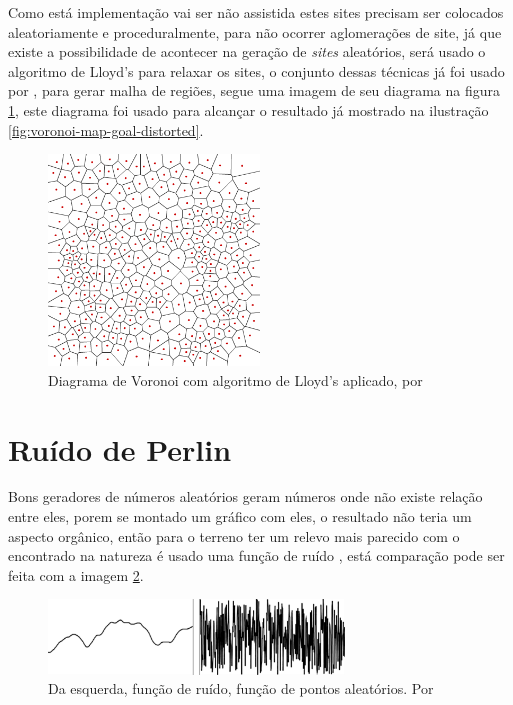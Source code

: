 Como está implementação vai ser não assistida estes sites precisam ser colocados
aleatoriamente e proceduralmente, para não ocorrer aglomerações de site, já
que existe a possibilidade de acontecer na geração de \textit{sites} aleatórios,
será usado o algoritmo de Lloyd's para relaxar os sites, o conjunto dessas
técnicas já foi usado por \cite{patel2010polygonal}, para gerar malha de regiões,
segue uma imagem de seu diagrama na figura \ref{fig:voronoi-2-lloyd}, este diagrama
foi usado para alcançar o resultado já mostrado na ilustração \ref{fig:voronoi-map-goal-distorted}.
\begin{figure}[H]
    \centering
    \includegraphics[width=0.5\textwidth]{figuras/voronoi-2-lloyd.png}
    \caption{Diagrama de Voronoi com algoritmo de Lloyd's aplicado, por \cite{patel2010polygonal}}
    \label{fig:voronoi-2-lloyd}
\end{figure}

\section{Ruído de Perlin}
Bons geradores de números aleatórios geram números onde não existe relação entre
eles, porem se montado um gráfico com eles, o resultado não teria um aspecto
orgânico, então para o terreno ter um relevo mais parecido com o encontrado na 
natureza é usado uma função de ruído \cite{shiffman2012nature}, está comparação
pode ser feita com a imagem \ref{fig:randomAndNoise}. 
\begin{figure}[H]
    \centering
    \includegraphics[width=0.7\textwidth]{figuras/randomAndNoise.png}
    \caption{Da esquerda, função de ruído, função de pontos aleatórios. Por \cite{shiffman2012nature}}
    \label{fig:randomAndNoise}
\end{figure}

